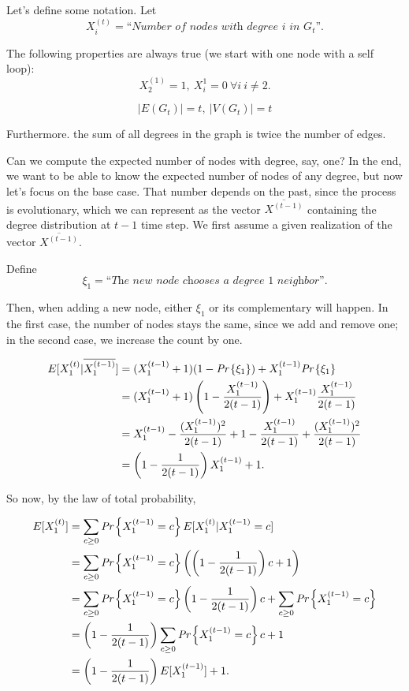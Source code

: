 Let's define some notation. Let
\begin{equation}
	X_i^{(t)} = \textit{``Number of nodes with degree $i$ in $G_t$''}.
\end{equation}

The following properties are always true (we start with one node with a self loop):
\begin{equation}
	X_2^{(1)} = 1,\ X_i^{{1}} = 0\ \forall i\ i \neq 2.
\end{equation}

\begin{equation}
	|E(G_t)| = t,\ |V(G_t)| = t
\end{equation}

Furthermore. the sum of all degrees in the graph is twice the number of edges.

Can we compute the expected number of nodes with degree, say, one? In the end, we want to be able to know the expected number of nodes of any degree, but now let's focus on the base case. That number depends on the past, since the process is evolutionary, which we can represent as the vector  $\overline{X^{(t-1)}}$ containing the degree distribution at $t-1$ time step. We first assume a given realization of the vector $\overline{X^{(t-1)}}$.

Define
\begin{equation}
	\xi_1 = \textit{``The new node chooses a degree $1$ neighbor''}.
\end{equation}

Then, when adding a new node, either $\xi_1$ or its complementary will happen. In the first case, the number of nodes stays the same, since we add and remove one; in the second case, we increase the count by one.

\begin{align*}
	E[X_1^{(t)} | \overline{X_1^{(t-1)}}] &= (X_1^{(t-1)} + 1)(1-\emph{Pr}\left\{\xi_1\right\}) + X_1^{(t-1)}\emph{Pr}\left\{\xi_1\right\}\\
	&=(X_1^{(t-1)} + 1)\left(1-\frac{X_1^{(t-1)}}{2(t-1)}\right) + X_1^{(t-1)}\frac{X_1^{(t-1)}}{2(t-1)}\\
	&=X_1^{(t-1)} -\frac{(X_1^{(t-1)})^2}{2(t-1)} + 1 - \frac{X_1^{(t-1)}}{2(t-1)} +\frac{(X_1^{(t-1)})^2}{2(t-1)}\\
	&= \left(1 - \frac{1}{2(t-1)}\right)X_1^{(t-1)} + 1.
\end{align*}

So now, by the law of total probability,

\begin{align*}
E[X_1^{(t)}] &= \sum_{c \geq 0}\emph{Pr}\left\{X_1^{(t-1)} = c\right\}E[X_1^{(t)}|X_1^{(t-1)}=c]\\
&=\sum_{c \geq 0}\emph{Pr}\left\{X_1^{(t-1)}=c\right\}\left(\left(1-\frac{1}{2(t-1)}\right)c + 1\right)\\
&=\sum_{c \geq 0}\emph{Pr}\left\{X_1^{(t-1)}=c\right\}\left(1-\frac{1}{2(t-1)}\right)c +\sum_{c \geq 0}\emph{Pr}\left\{X_1^{(t-1)}=c\right\}\\
&=\left(1 - \frac{1}{2(t-1)}\right)\sum_{c \geq 0}\emph{Pr}\left\{X_1^{(t-1)} = c\right\}c + 1\\
&=\left(1 - \frac{1}{2(t-1)}\right)E[X_1^{(t-1)}] + 1.
\end{align*}

